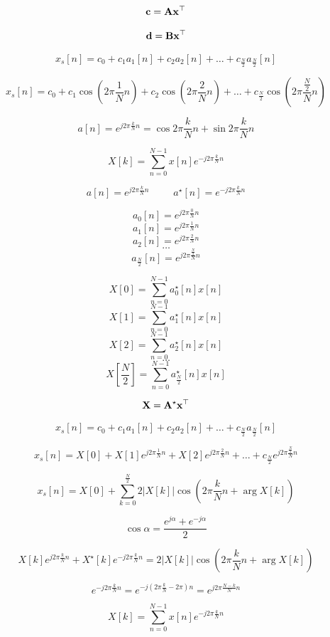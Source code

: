 \documentclass{article}[12pt]
\begin{document}
$${\bf c} = {\bf A} {\bf x}^\top$$

$${\bf d} = {\bf B} {\bf x}^\top$$

$$x_s[n] = c_0 + c_1 a_1[n] + c_2 a_2 [n] + \ldots + c_{\frac{N}{2}}
a_{\frac{N}{2}} [n] $$

$$x_s[n]  = c_0 +  c_1 \cos (2 \pi \frac{1}{N} n) + c_2 \cos (2 \pi
\frac{2}{N} n) + \ldots + c_{\frac{N}{2}}\cos (2 \pi
\frac{\frac{N}{2}}{N} n)$$


$$a[n] = e^{j 2 \pi \frac{k}{N} n} = \cos 2 \pi \frac{k}{N} n + \sin 2
\pi \frac{k}{N} n $$

$$X[k]= \sum_{n=0}^{N-1}x[n] e^{-j 2 \pi \frac{k}{N} n}$$ %

$$a[n] = e^{j 2 \pi \frac{k}{N} n}~~~~~~~~~~~a^\star[n] = e^{-j 2 \pi
  \frac{k}{N} n}$$

$$a_0[n] = e^{j 2 \pi \frac{0}{N} n}$$
$$a_1[n] = e^{j 2 \pi \frac{1}{N} n}$$
$$a_2[n] = e^{j 2 \pi \frac{2}{N} n}$$
$$\ldots$$
$$a_{\frac{N}{2}}[n] = e^{j 2 \pi \frac{\frac{N}{2}}{N} n}$$
 
$$X[0] = \sum_{n=0}^{N-1} a_0^\star[n] x[n]$$
$$X[1] = \sum_{n=0}^{N-1} a_1^\star[n] x[n]$$
$$X[2] = \sum_{n=0}^{N-1} a_2^\star[n] x[n]$$
$$\ldots$$
$$X[\frac{N}{2}] = \sum_{n=0}^{N-1} a_{\frac{N}{2}}^\star[n] x[n]$$

$${\bf X} = {\bf A}^\star  {\bf x}^\top$$

$$x_s[n] = c_0 + c_1 a_1[n] + c_2 a_2 [n] + \ldots + c_{\frac{N}{2}}
a_{\frac{N}{2}} [n] $$

$$x_s[n] = X[0] + X[1] e^{j 2 \pi \frac{1}{N} n}  + X[2] e^{j 2 \pi
  \frac{2}{N} n} + \ldots + c_{\frac{N}{2}} e^{j 2 \pi
  \frac{\frac{N}{2}}{N} n}$$

$$x_s[n] = X[0] + \sum_{k = 0}^{\frac{N}{2}} 2 |X[k]| \cos \left ( 2
\pi \frac{k}{N} n + \arg X[k] \right ) $$

$$\cos \alpha = \frac{e^{j \alpha} + e^{-j \alpha}}{2}$$ 

$$X[k] e^{j 2 \pi \frac{k}{N} n} + X^\star[k] e^{-j 2 \pi \frac{k}{N}
  n} = 2 |X[k]| \cos \left (2 \pi \frac{k}{N} n +
\arg X[k] \right ) $$

$$e^{-j 2 \pi \frac{k}{N}n} = e^{-j (2 \pi \frac{k}{N} - 2\pi)n}
 = e^{j 2\pi  \frac{N-k}{N} n} $$

$$X[k]= \sum_{n=0}^{N-1}x[n] e^{-j 2 \pi \frac{k}{N} n}$$ %
\end{document}
